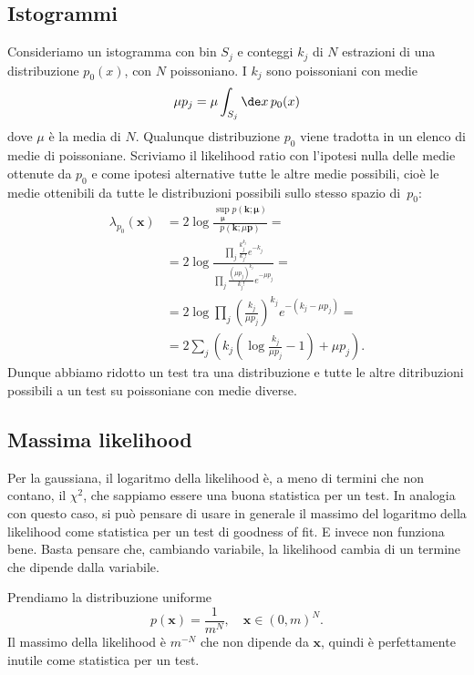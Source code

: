 
\subsection{Istogrammi}

Consideriamo un istogramma con bin $S_j$ e conteggi $k_j$
di $N$ estrazioni di una distribuzione $p_0(x)$,
con $N$ poissoniano.
I $k_j$ sono poissoniani con medie
\begin{equation*}
	\mu p_j = \mu \int_{S_j} \de x\, p_0(x)
\end{equation*}
dove $\mu$ è la media di $N$.
Qualunque distribuzione $p_0$ viene tradotta in un elenco di medie di poissoniane.
Scriviamo il likelihood ratio con l'ipotesi nulla delle medie ottenute da $p_0$
e come ipotesi alternative tutte le altre medie possibili,
cioè le medie ottenibili da tutte le distribuzioni possibili sullo stesso spazio di~$p_0$:
\begin{align*}
	\lambda_{p_0}(\mathbf x)
	&= 2\log \frac
	{\sup\limits_{\boldsymbol\mu} p(\mathbf k;\boldsymbol\mu)}
	{p(\mathbf k;\mu \mathbf p)} = \\
	&= 2\log \frac
	{\prod_j \frac {k_j^{k_j}} {k_j!} e^{-k_j}}
	{\prod_j \frac {(\mu p_j)^{k_j}} {k_j!} e^{-\mu p_j}} = \\
	&= 2\log \prod_j \left(\frac{k_j}{\mu p_j}\right)^{k_j} e^{-(k_j-\mu p_j)} = \\
	&= 2\sum_j \left( k_j\left(\log\frac{k_j}{\mu p_j}-1\right) + \mu p_j \right).
\end{align*}
Dunque abbiamo ridotto un test tra una distribuzione e tutte le altre ditribuzioni possibili
a un test su poissoniane con medie diverse.

\subsection{Massima likelihood}

Per la gaussiana,
il logaritmo della likelihood è, a meno di termini che non contano, il $\chi^2$,
che sappiamo essere una buona statistica per un test.
In analogia con questo caso,
si può pensare di usare in generale il massimo del logaritmo della likelihood
come statistica per un test di goodness of fit.
E invece non funziona bene.
Basta pensare che, cambiando variabile,
la likelihood cambia di un termine che dipende dalla variabile.

\begin{example}
	Prendiamo la distribuzione uniforme
	\begin{equation*}
		p(\mathbf x) = \frac1{m^N},
		\quad \mathbf x \in (0,m)^N.
	\end{equation*}
	Il massimo della likelihood è $m^{-N}$ che non dipende da $\mathbf x$,
	quindi è perfettamente inutile come statistica per un test.
\end{example}

